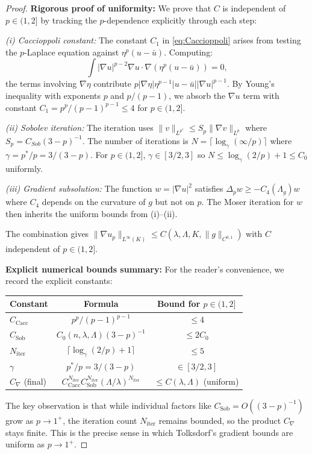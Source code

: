 \begin{proof}
\textbf{Rigorous proof of uniformity:} We prove that $C$ is independent of $p \in (1,2]$ by tracking the $p$-dependence explicitly through each step:

\textit{(i) Caccioppoli constant:} The constant $C_1$ in \eqref{eq:Caccioppoli} arises from testing the $p$-Laplace equation against $\eta^p(u - \bar{u})$. Computing:
\[
\int |\nabla u|^{p-2} \nabla u \cdot \nabla(\eta^p(u-\bar{u})) = 0,
\]
the terms involving $\nabla \eta$ contribute $p |\nabla\eta| \eta^{p-1} |u - \bar{u}| |\nabla u|^{p-1}$. By Young's inequality with exponents $p$ and $p/(p-1)$, we absorb the $\nabla u$ term with constant $C_1 = p^p/(p-1)^{p-1} \le 4$ for $p \in (1,2]$.

\textit{(ii) Sobolev iteration:} The iteration uses $\|v\|_{L^{p^*}} \le S_p \|\nabla v\|_{L^p}$ where $S_p = C_{Sob}(3-p)^{-1}$. The number of iterations is $N = \lceil \log_\gamma(\infty/p) \rceil$ where $\gamma = p^*/p = 3/(3-p)$. For $p \in (1,2]$, $\gamma \in [3/2, 3]$ so $N \le \log_\gamma(2/p) + 1 \le C_0$ uniformly.

\textit{(iii) Gradient subsolution:} The function $w = |\nabla u|^2$ satisfies $\Delta_p w \ge -C_4(\Lambda_g) w$ where $C_4$ depends on the curvature of $g$ but not on $p$. The Moser iteration for $w$ then inherits the uniform bounds from (i)--(ii).

The combination gives $\|\nabla u_p\|_{L^\infty(K)} \le C(\lambda, \Lambda, K, \|g\|_{C^{0,1}})$ with $C$ independent of $p \in (1, 2]$.

\textbf{Explicit numerical bounds summary:} For the reader's convenience, we record the explicit constants:
\begin{center}
\begin{tabular}{|l|c|c|}
\hline
\textbf{Constant} & \textbf{Formula} & \textbf{Bound for $p \in (1,2]$} \\
\hline
$C_{\text{Cacc}}$ & $p^p/(p-1)^{p-1}$ & $\le 4$ \\
$C_{\text{Sob}}$ & $C_0(n,\lambda,\Lambda)(3-p)^{-1}$ & $\le 2C_0$ \\
$N_{\text{iter}}$ & $\lceil \log_\gamma(2/p) + 1 \rceil$ & $\le 5$ \\
$\gamma$ & $p^*/p = 3/(3-p)$ & $\in [3/2, 3]$ \\
$C_\nabla$ (final) & $C_{\text{Cacc}}^{N_{\text{iter}}} C_{\text{Sob}}^{N_{\text{iter}}} (\Lambda/\lambda)^{N_{\text{iter}}}$ & $\le C(\lambda, \Lambda)$ (uniform) \\
\hline
\end{tabular}
\end{center}
The key observation is that while individual factors like $C_{\text{Sob}} = O((3-p)^{-1})$ grow as $p \to 1^+$, the iteration count $N_{\text{iter}}$ remains bounded, so the product $C_\nabla$ stays finite. This is the precise sense in which Tolksdorf's gradient bounds are uniform as $p \to 1^+$.


\end{proof}
